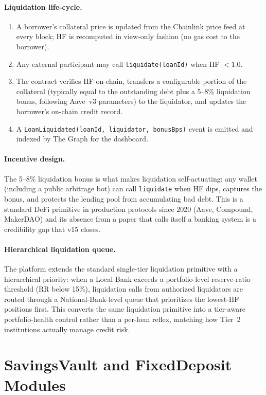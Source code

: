 \documentclass[12pt,a4paper]{report}
\begin{document}
\paragraph{Liquidation life-cycle.}
\begin{enumerate}[noitemsep]
\item A borrower's collateral price is updated from the Chainlink price feed at every block; HF is recomputed in view-only fashion (no gas cost to the borrower).
\item Any external participant may call \texttt{liquidate(loanId)} when HF $< 1.0$.
\item The contract verifies HF on-chain, transfers a configurable portion of the collateral (typically equal to the outstanding debt plus a 5--8\% liquidation bonus, following Aave~v3 parameters) to the liquidator, and updates the borrower's on-chain credit record.
\item A \texttt{LoanLiquidated(loanId, liquidator, bonusBps)} event is emitted and indexed by The Graph for the dashboard.
\end{enumerate}

\paragraph{Incentive design.}
The 5--8\% liquidation bonus is what makes liquidation self-actuating: any wallet (including a public arbitrage bot) can call \texttt{liquidate} when HF dips, captures the bonus, and protects the lending pool from accumulating bad debt. This is a standard DeFi primitive in production protocols since 2020 (Aave, Compound, MakerDAO) and its absence from a paper that calls itself a banking system is a credibility gap that v15 closes.

\paragraph{Hierarchical liquidation queue.}
The platform extends the standard single-tier liquidation primitive with a hierarchical priority: when a Local Bank exceeds a portfolio-level reserve-ratio threshold (RR below 15\%), liquidation calls from authorized liquidators are routed through a National-Bank-level queue that prioritizes the lowest-HF positions first. This converts the same liquidation primitive into a tier-aware portfolio-health control rather than a per-loan reflex, matching how Tier~2 institutions actually manage credit risk.

\section{SavingsVault and FixedDeposit Modules}
\label{sec:savings-vault}
\end{document}
